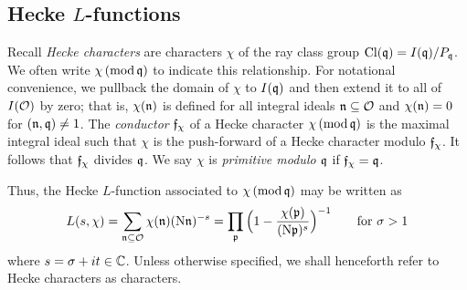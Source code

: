 \documentclass[12pt,psamsfonts]{amsart}
\theoremstyle{definition}
\theoremstyle{remark}
\numberwithin{equation}{section}
\newcounter{notation}
\begin{document}

\subsection{Hecke $L$-functions}
\label{HeckeL-functions}
Recall \emph{Hecke characters} are characters $\chi$ of the ray class group $\mathrm{Cl}(\mathfrak{q}) = I(\mathfrak{q})/P_{\mathfrak{q}}$. We often write $\chi \, (\mathrm{mod} {\, \mathfrak{q}})$ to indicate this relationship. For notational convenience, we pullback the domain of $\chi$ to  $I(\mathfrak{q})$ and then extend it to all of $I(\mathcal{O})$ by zero; that is, $\chi(\mathfrak{n})$ is defined for all integral ideals $\mathfrak{n} \subseteq \mathcal{O}$ and $\chi(\mathfrak{n}) = 0$ for $(\mathfrak{n},\mathfrak{q}) \neq 1$. The \emph{conductor} $\mathfrak{f}_{\chi}$ of a Hecke character $\chi \, (\mathrm{mod} {\, \mathfrak{q}})$ is the maximal integral ideal such that $\chi$ is the push-forward of a Hecke character modulo $\mathfrak{f}_{\chi}$. It follows that $\mathfrak{f}_{\chi}$ divides $\mathfrak{q}$. We say $\chi$ is \emph{primitive modulo $\mathfrak{q}$} if $\mathfrak{f}_{\chi} = \mathfrak{q}$. 

Thus, the Hecke $L$-function associated to $\chi \, (\mathrm{mod} {\, \mathfrak{q}})$ may be written as
\[
L(s,\chi) = \sum_{\mathfrak{n} \subseteq \mathcal{O}} \chi(\mathfrak{n}) (\mathrm{N}{\mathfrak{n}})^{-s} = \prod_{\mathfrak{p}} \Big(1-\frac{\chi(\mathfrak{p})}{(\mathrm{N}{\mathfrak{p}})^s} \Big)^{-1} \qquad \text{for $\sigma > 1$}
\]
where $s = \sigma + it \in \mathbb{C}$. Unless otherwise specified, we shall henceforth refer to Hecke characters as characters.
\end{document}
